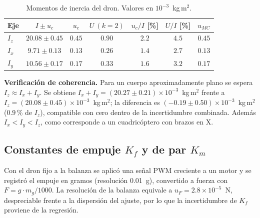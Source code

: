 \begin{table}[H]
\centering
\caption{Momentos de inercia del dron. Valores en $10^{-3}$~kg\,m$^2$.}\label{tab:res}
\small
\begin{tabular}{lcccccc}
\toprule
Eje & $I\pm u_c$ & $u_c$ & $U\ (k{=}2)$ & $u_c/I$ [\%] & $U/I$ [\%] & $u_{MC}$ \\
\midrule
$I_z$ & $20.08 \pm 0.45$ & $0.45$ & $0.90$ & $2.2$ & $4.5$ & $0.45$ \\
$I_x$ & $9.71 \pm 0.13$ & $0.13$ & $0.26$ & $1.4$ & $2.7$ & $0.13$ \\
$I_y$ & $10.56 \pm 0.17$ & $0.17$ & $0.33$ & $1.6$ & $3.2$ & $0.17$ \\
\bottomrule
\end{tabular}
\end{table}

\textbf{Verificación de coherencia.} Para un cuerpo aproximadamente plano se espera $I_z\approx I_x+I_y$. Se obtiene $I_x+I_y=(20.27\pm0.21)\times10^{-3}$~kg\,m$^2$ frente a $I_z=(20.08\pm0.45)\times10^{-3}$~kg\,m$^2$; la diferencia es $(-0.19\pm0.50)\times10^{-3}$~kg\,m$^2$ ($0.9$\,\% de $I_z$), compatible con cero dentro de la incertidumbre combinada. Además $I_x<I_y<I_z$, como corresponde a un cuadricóptero con brazos en X.

\subsection*{Constantes de empuje $K_f$ y de par $K_m$}
Con el dron fijo a la balanza se aplicó una señal PWM creciente a un motor y se registró el empuje en gramos (resolución 0.01~g), convertido a fuerza con $F=g\cdot m_g/1000$. La resolución de la balanza equivale a $u_F=2.8\times10^{-5}$~N, despreciable frente a la dispersión del ajuste, por lo que la incertidumbre de $K_f$ proviene de la regresión.

